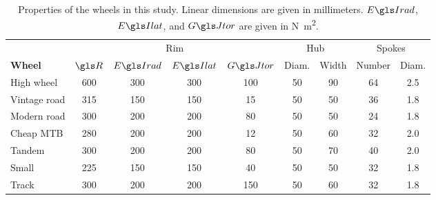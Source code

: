 \documentclass[../../thesis.tex]{subfiles}
\begin{document}
\begin{table}
\caption{Properties of the wheels in this study. Linear dimensions are given in millimeters. $\EIr$, $\EIl$, and $\GJ$ are given in \si{N.m^2}.}
\label{tab:example_wheel_props}
\begin{tabular}{lcccccccc}
\toprule
&\multicolumn{4}{c}{Rim} & \multicolumn{2}{c}{Hub} & \multicolumn{2}{c}{Spokes}\\
\cmidrule(r){2-5}
\cmidrule(r){6-7}
\cmidrule(r){8-9}
\bf{Wheel} & $\R$ & $\EIr$ & $\EIl$ & $\GJ$ & Diam. & Width & Number & Diam.\\
\midrule
High wheel   & 600 & 300 & 300 & 100 & 50 & 90 & 64 & 2.5\\
Vintage road & 315 & 150 & 150 & 15  & 50 & 50 & 36 & 1.8\\
Modern road  & 300 & 200 & 200 & 80  & 50 & 50 & 24 & 1.8\\
Cheap MTB    & 280 & 200 & 200 & 12  & 50 & 60 & 32 & 2.0\\
Tandem       & 300 & 200 & 200 & 80  & 50 & 70 & 40 & 2.0\\
Small        & 225 & 150 & 150 & 40  & 50 & 50 & 32 & 1.8\\
Track        & 300 & 200 & 200 & 150 & 50 & 60 & 32 & 1.8\\
\bottomrule
\end{tabular}
\end{table}
\end{document}

